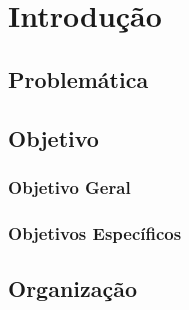 \chapter{Introdução}

\section{Problemática}

\section{Objetivo}
\subsection{ Objetivo Geral}

\subsection{Objetivos Específicos}

\section{Organização}
